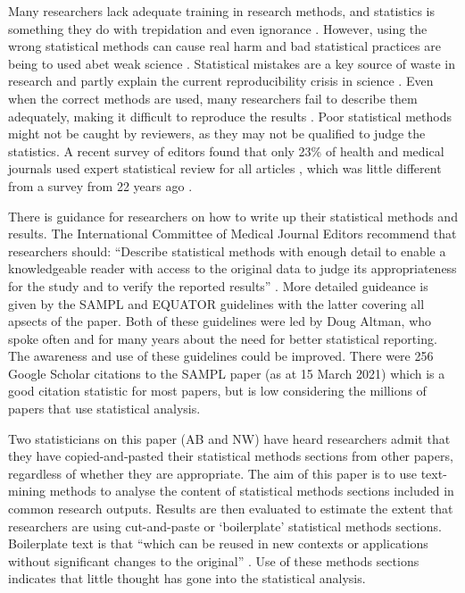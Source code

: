 \documentclass[12pt]{article}
\begin{document}
Many researchers lack adequate training in research methods, and
statistics is something they do with trepidation and even ignorance
\citep{Altman1994, King2019}. However, using the wrong statistical
methods can cause real harm \citep{Altman1994, Brown2018} and bad
statistical practices are being to used abet weak science
\citep{Stark2018}. Statistical mistakes are a key source of waste in
research and partly explain the current reproducibility crisis in
science \citep{Allison2016}. Even when the correct methods are used,
many researchers fail to describe them adequately, making it difficult
to reproduce the results \citep{Ernst2017, Zhou2018}. Poor statistical
methods might not be caught by reviewers, as they may not be qualified
to judge the statistics. A recent survey of editors found that only 23\%
of health and medical journals used expert statistical review for all
articles \citep{Hardwicke2020}, which was little different from a survey
from 22 years ago \citep{Goodman1998}.

There is guidance for researchers on how to write up their statistical
methods and results. The International Committee of Medical Journal
Editors recommend that researchers should: ``Describe statistical
methods with enough detail to enable a knowledgeable reader with access
to the original data to judge its appropriateness for the study and to
verify the reported results'' \citep{ICMJE2019}. More detailed guideance
is given by the SAMPL and EQUATOR guidelines
\citep{Lang2013, Altman2016} with the latter covering all apsects of the
paper. Both of these guidelines were led by Doug Altman, who spoke often
and for many years about the need for better statistical reporting. The
awareness and use of these guidelines could be improved. There were 256
Google Scholar citations to the SAMPL paper (as at 15 March 2021) which
is a good citation statistic for most papers, but is low considering the
millions of papers that use statistical analysis.

Two statisticians on this paper (AB and NW) have heard researchers admit
that they have copied-and-pasted their statistical methods sections from
other papers, regardless of whether they are appropriate. The aim of
this paper is to use text-mining methods to analyse the content of
statistical methods sections included in common research outputs.
Results are then evaluated to estimate the extent that researchers are
using cut-and-paste or `boilerplate' statistical methods sections.
Boilerplate text is that ``which can be reused in new contexts or
applications without significant changes to the original''
\citep{Wikipedia}. Use of these methods sections indicates that little
thought has gone into the statistical analysis.
\end{document}
